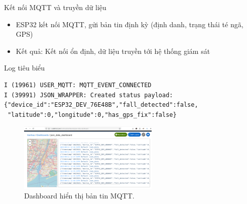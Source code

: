 \begin{frame}[fragile]{Kết nối MQTT và truyền dữ liệu}
    \begin{itemize}
        \item ESP32 kết nối MQTT, gửi bản tin định kỳ (định danh, trạng thái té ngã, GPS)
        \item Kết quả: Kết nối ổn định, dữ liệu truyền tới hệ thống giám sát
    \end{itemize}
    \begin{block}{Log tiêu biểu}
        \begin{verbatim}
I (19961) USER_MQTT: MQTT_EVENT_CONNECTED
I (39991) JSON_WRAPPER: Created status payload:
{"device_id":"ESP32_DEV_76E48B","fall_detected":false,
 "latitude":0,"longitude":0,"has_gps_fix":false}
        \end{verbatim}
    \end{block}
    \begin{figure}
        \centering
        \includegraphics[width=0.6\textwidth]{images/json_data_dashboard.png}
        \caption{Dashboard hiển thị bản tin MQTT.}
    \end{figure}
\end{frame}

